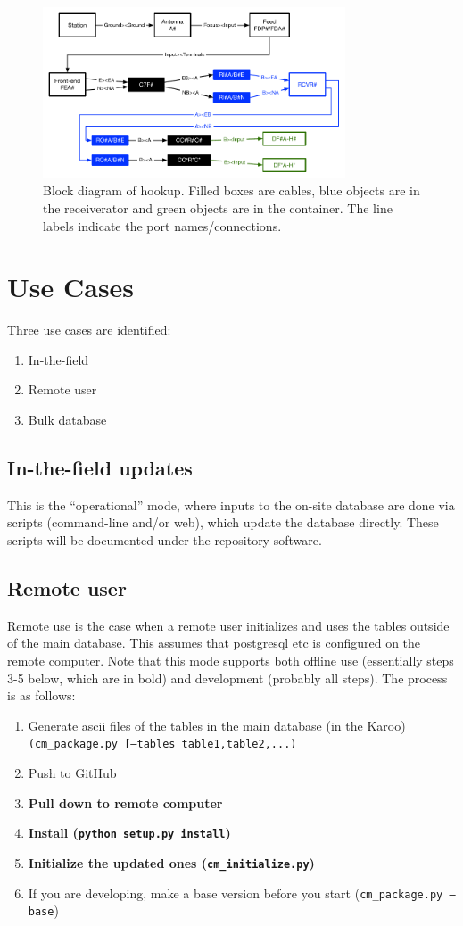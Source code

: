 \documentclass{article}
\begin{document}
\begin{figure}[H]
\includegraphics[width=0.8\textwidth]{hookup.pdf}
\centering
\caption{Block diagram of hookup.  Filled boxes are cables, blue objects are in the receiverator and green objects are in the container.
The line labels indicate the port names/connections.}
\label{fig:hookup}
\end{figure}

\section{Use Cases}
Three use cases are identified:
\begin{enumerate}\setlength\itemsep{-.3em}
	\item In-the-field
	\item Remote user
	\item Bulk database
\end{enumerate}

\subsection{In-the-field updates}
This is the ``operational'' mode, where inputs to the on-site database are done via scripts (command-line and/or web), which update the database directly.  These scripts will be documented under the repository software.

\subsection{Remote user}
Remote use is the case when a remote user initializes and uses the tables outside of the main database.  This assumes that postgresql etc is configured on the remote computer.  Note that this mode supports both offline use (essentially steps 3-5 below, which are in bold) and development (probably all steps).  The process is as follows: 
\begin{enumerate}\setlength\itemsep{-.3em}
	\item Generate ascii files of the tables in the main database (in the Karoo) {\tt (cm\_package.py [--tables table1,table2,...)}
	\item Push to GitHub
	\item {\bf Pull down to remote computer}
	\item {\bf Install ({\tt python setup.py install})}
	\item {\bf Initialize the updated ones ({\tt cm\_initialize.py})}
	\item If you are developing, make a base version before you start ({\tt cm\_package.py --base})
\end{enumerate}
\end{document}

